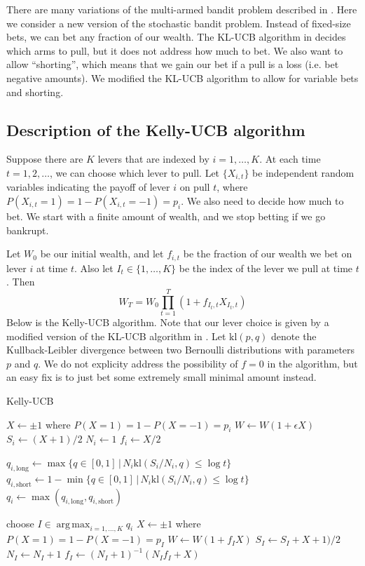 \documentclass[letterpaper]{article}
\DeclareMathOperator*{\argmax}{arg\,max}
\numberwithin{equation}{section}
\theoremstyle{plain}
\begin{document}
There are many variations of the multi-armed bandit problem described in \cite{bubeck2012regret}. Here we consider a new version of the stochastic bandit problem. Instead of fixed-size bets, we can bet any fraction of our wealth. The KL-UCB algorithm in \cite{cappe2013kullback} decides which arms to pull, but it does not address how much to bet. We also want to allow ``shorting'', which means that we gain our bet if a pull is a loss (i.e. bet negative amounts). We modified the KL-UCB algorithm to allow for variable bets and shorting.

\subsection{Description of the Kelly-UCB algorithm}
Suppose there are $K$ levers that are indexed by $i=1,\ldots, K$. At each time $t=1,2,\ldots$, we can choose which lever to pull. Let $\{X_{i,t}\}$ be independent random variables indicating the payoff of lever $i$ on pull $t$, where $P(X_{i,t}=1) = 1-P(X_{i,t}=-1) = p_i$. We also need to decide how much to bet. We start with a finite amount of wealth, and we stop betting if we go bankrupt.

Let $W_0$ be our initial wealth, and let $f_{i,t}$ be the fraction of our wealth we bet on lever $i$ at time $t$. Also let $I_t\in\{1,\ldots,K\}$ be the index of the lever we pull at time $t$. Then
\begin{equation}\label{eq:wealth_def}
W_T = W_0 \prod_{t=1}^T (1+f_{I_t, t}X_{I_t,t})
\end{equation}
Below is the Kelly-UCB algorithm. Note that our lever choice is given by a modified version of the KL-UCB algorithm in \cite{cappe2013kullback}. Let $\text{kl}(p,q)$ denote the Kullback-Leibler divergence between two Bernoulli distributions with parameters $p$ and $q$. We do not explicity address the possibility of $f=0$ in the algorithm, but an easy fix is to just bet some extremely small minimal amount instead.

\begin{algorithm}
\caption{Kelly-UCB}\label{alg:kl_ucb}
\begin{algorithmic}[1]
\State $X \gets \pm 1$ where $P(X=1) = 1-P(X=-1) = p_i$
\State $W \gets W(1+\epsilon X)$
\State $S_i \gets (X+1)/2$
\State $N_i \gets 1$
\State $f_i \gets X/2$
\EndFor


\State $q_{i,\text{long}} \gets \max\{q\in[0,1]\,|\,N_i \text{kl}(S_i/N_i, q) \le \log t\}$
\State $q_{i,\text{short}} \gets 1-\min\{q\in[0,1]\,|\,N_i \text{kl}(S_i/N_i, q) \le \log t\}$
\State $q_i \gets \max(q_{i,\text{long}}, q_{i,\text{short}})$
\EndFor

\State choose $I \in \argmax_{i=1,\ldots,K} q_i$
\State $X \gets \pm 1$ where $P(X=1) = 1-P(X=-1) = p_I$
\State $W \gets W(1+ f_I X)$ %
\State $S_I \gets S_I + X+1)/2$
\State $N_I \gets N_I + 1$
\State $f_I \gets (N_I+1)^{-1}(N_If_I + X)$
\EndFor
\end{algorithmic}
\end{algorithm}
\end{document}
